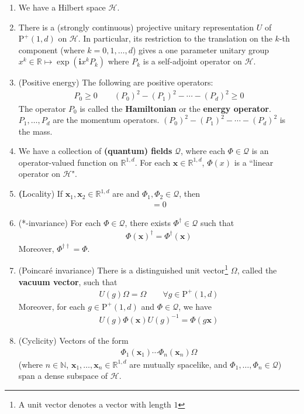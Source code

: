 \documentclass[12pt,b5paper,notitlepage]{article}
\theoremstyle{definition}
\theoremstyle{plain}
\newcommand{\mc}{\mathcal}
\newcommand{\scr}{\mathscr}
\newcommand{\im}{\mathbf{i}}
\newcommand{\mbf}{\mathbf}
\newcommand{\Nbb}{\mathbb N}
\newcommand{\Rbb}{\mathbb R}
\newcommand{\Poid}{{\mathrm P}^+(1,d)}
\newcommand{\xbf}{\mathbf x}
\numberwithin{equation}{section}
\begin{document}
\begin{enumerate}[label=(\arabic*)]
\item We have a Hilbert space $\mc H$.
\item There is a (strongly continuous) projective unitary representation $U$ of $\Poid$ on $\mc H$. In particular, its restriction to the translation on the $k$-th component (where $k=0,1,\dots,d$) gives a one parameter unitary group $x^k\in\Rbb\mapsto \exp(\im x^k P_k)$ where $P_k$ is a self-adjoint operator on $\mc H$.
\item (Positive energy) The following are positive operators:
\begin{align*}
P_0\geq0\qquad (P_0)^2-(P_1)^2-\cdots-(P_d)^2\geq0
\end{align*}
The operator $P_0$ is called the \textbf{Hamiltonian} or the \textbf{energy operator}. $P_1,\dots,P_d$ are the momentum operators. $(P_0)^2-(P_1)^2-\cdots-(P_d)^2$ is the mass.
\item We have a collection of \textbf{(quantum) fields} $\scr Q$, where each $\Phi\in\scr Q$ is an operator-valued function on $\Rbb^{1,d}$. For each $\mbf x\in\Rbb^{1,d}$, $\Phi(x)$ is a ``linear operator on $\mc H$".  
\item {\textbf(Locality})  If $\xbf_1,\xbf_2\in\Rbb^{1,d}$ are  and $\Phi_1,\Phi_2\in\scr Q$, then
\begin{align}
[\Phi_1(x_1),\Phi_2(x_2)]=0
\end{align}
\item (*-invariance) For each $\Phi\in\scr Q$, there exists $\Phi^\dagger\in\scr Q$ such that
\begin{align}\label{eq3}
\Phi(\xbf)^\dagger=\Phi^\dagger(\xbf)
\end{align}
Moreover, $\Phi^{\dagger\dagger}=\Phi$.
\item (Poincar\'e invariance) There is a distinguished unit vector\footnote{A unit vector denotes a vector with length $1$} $\Omega$, called the \textbf{vacuum vector}, such that
\begin{align*}
U(g)\Omega=\Omega\qquad\forall g\in\Poid
\end{align*}
Moreover, for each $g\in\Poid$ and $\Phi\in\scr Q$, we have
\begin{align}\label{eq2}
U(g)\Phi(\xbf)U(g)^{-1}=\Phi(g\xbf)
\end{align}
\item (Cyclicity) Vectors of the form
\begin{align}\label{eq4}
\Phi_1(\xbf_1)\cdots\Phi_n(\xbf_n)\Omega
\end{align}
(where $n\in\Nbb$, $\xbf_1,\dots,\xbf_n\in\Rbb^{1,d}$ are mutually spacelike, and $\Phi_1,\dots,\Phi_n\in\scr Q$) span a dense subspace of $\mc H$.
\end{enumerate}
\end{document}
